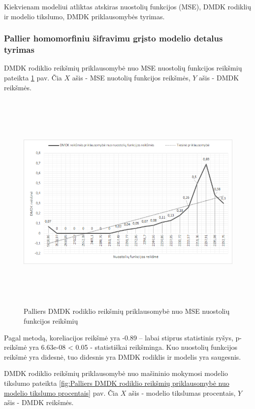 \documentclass{VUMIFInfBakalaurinis}
\begin{document}
\par Kiekvienam modeliui atliktas atskiras nuostolių funkcijos (MSE), DMDK rodiklių ir modelio tikslumo, DMDK priklausomybės tyrimas.

\subsubsection{Pallier homomorfiniu šifravimu grįsto modelio detalus tyrimas}
\par DMDK rodiklio reikšmių priklausomybė nuo MSE nuostolių funkcijos reikšmių pateikta \ref{fig:Palliers DMDK rodiklio reikšmių priklausomybė nuo MSE nuostolių funkcijos reikšmių} pav. Čia $X$ ašis - MSE nuotolių funkcijos reikšmės, $Y$ ašis - DMDK reikšmės. 

\begin{figure}[h]
  \centering
  \includegraphics[width=14cm,height=11cm,keepaspectratio]{img/pal_tyr_1.png}
  \caption{Palliers DMDK rodiklio reikšmių priklausomybė nuo MSE nuostolių funkcijos reikšmių}
  \label{fig:Palliers DMDK rodiklio reikšmių priklausomybė nuo MSE nuostolių funkcijos reikšmių}
\end{figure}

\par Pagal  metodą, koreliacijos reikšmė yra -0.89 -- labai stiprus statistinis ryšys, p-reikšmė yra 6.63e-08 < 0.05 - statistiškai reikšminga. Kuo nuostolių funkcijos reikšmė yra didesnė, tuo didesnis yra DMDK rodiklis ir modelis yra saugesnis.

\par DMDK rodiklio reikšmių priklausomybė nuo mašininio mokymosi modelio tikslumo pateikta \ref{fig:Palliers DMDK rodiklio reikšmių priklausomybė nuo modelio tikslumo procentais} pav. Čia $X$ ašis - modelio tikslumas procentais, $Y$ ašis - DMDK reikšmės.
\end{document}
